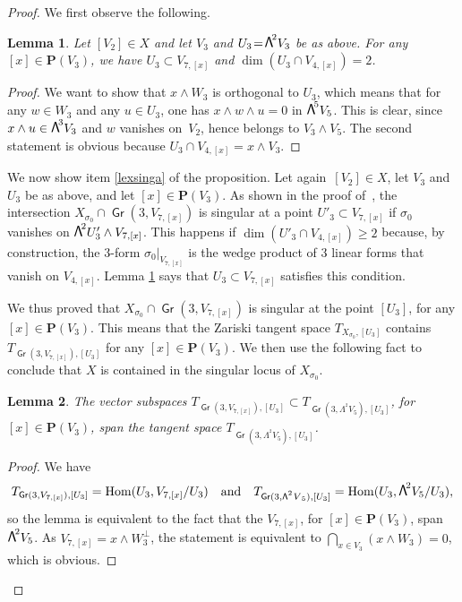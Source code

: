 \documentclass[JEP,XML,SOM,Unicode, NoEqCountersInSection,NoFloatCountersInSection]{cedram}
\newtheorem{lemm}{Lemma}[section]
\theoremstyle{definition}
\renewcommand\P{{\mathbf P}}\let\PP\P
\DeclareMathOperator{\Gr}{\mathsf{Gr}}
\DeclareMathOperator{\Hom}{Hom}
\newcommand\bw[1]{{\hbox{\large$\mathsf{\Lambda}$}^{\!#1}}}
\newcommand\sbw[2]{{{\mathsf{\Lambda}}^{^{\scriptscriptstyle#1}}{#2}}}
\begin{document}
\pagebreak[2]
\begin{proof}
We first observe the following.

\begin{lemm}
\label{sublepourg6}
Let $[V_2]\!\in\!X$
and let $V_3$ and $U_3\!=\!\bw2V_3$ be as above. For any $[x]\!\in\!\P(V_3)$, we have $U_3\subset V_{7,[x]}$ and $\dim (U_3\cap V_{4,[x]})=2$.
\end{lemm}

\begin{proof} We want to show that $x\wedge W_3$ is orthogonal to
$U_3$, which means that
for any $w\in W_3$ and any $u\in U_3$, one has $x\wedge w\wedge u=0$ in $\bw5V_5$. This is clear, since
$x\wedge u\in \bw3V_3$ and $w$ vanishes on~$V_2$, hence belongs to $V_3\wedge V_5$.
The second statement is obvious because $U_3\cap V_{4,[x]}=x\wedge V_3$.
\end{proof}

We now show item \eqref{lexsinga} of the proposition. Let again~\mbox{$[V_2]\in X$,} let $V_3$ and $U_3$ be as above, and let $[x]\in \P(V_3)$. As shown in the proof of~\cite[Prop.\,3.1]{devo}, the intersection $X_{\sigma_0}\cap \Gr(3,V_{7,[x]})$ is singular at a point $U'_3\subset V_{7,[x]}$ if $\sigma_0$ vanishes on $\bw2U'_3\wedge V_{7,[x]}$. This happens if $\dim(U'_3\cap V_{4,[x]})\ge2$ because, by construction, the $3$-form $\sigma_0\vert_{ V_{7,[x]}}$ is the wedge product of 3 linear forms that vanish on $V_{4,[x]}$.
Lemma \ref{sublepourg6} says that $U_3\subset V_{7,[x]}$ satisfies this condition.

We thus proved that
$X_{\sigma_0}\cap \Gr(3,V_{7,[x]})$ is singular at the point $[U_3]$, for any $[x]\in \P(V_3)$.
This means that the Zariski tangent space $T_{X_{\sigma_0},[U_3]}$ contains $T_{\Gr(3,V_{7,[x]}),[U_3]}$ for any $[x]\in \P(V_3)$. We then use the following fact to conclude that $X$ is contained in the singular locus of $X_{\sigma_0}$.

\begin{lemm}\label{lepourpropsingx}
The vector subspaces $T_{\Gr(3,V_{7,[x]}),[U_3]}\subset
T_{\Gr(3,\sbw2V_5),[U_3]}$, for $[x]\in \P(V_3)$, span the tangent space $T_{\Gr(3,\sbw2V_5),[U_3]}$.
\end{lemm}

\begin{proof} We have
\[
T_{\Gr(3,V_{7,[x]}),[U_3]}=\Hom (U_3,V_{7,[x]}/U_3)\quad\text{and}\quad T_{\Gr(3,\sbw2V_5),[U_3]}=\Hom (U_3,\bw2V_5/U_3),
\]
so the lemma is equivalent to the fact that the $V_{7,[x]}$, for $[x]\in \P(V_3)$, span $\bw2V_5$. As
$V_{7,[x]}=x\wedge W_3^{\perp}$, the statement is equivalent to
$\bigcap_{x\in V_3}(x\wedge W_3)=0$, which is obvious.
\end{proof}


\end{proof}
\end{document}
